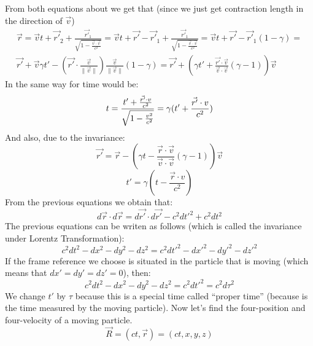 \documentclass{article}
\begin{document}
From both equations about we get that (since we just get contraction length in the direction of $\vec{v}$)
\begin{equation}
  \begin{split}
    \vec{r} = \vec{v}t + \vec{r'}_2 + \frac{\vec{r'}_1}{\sqrt{1-\frac{\vec{v}\cdot \vec{v}}{c^2}}} = \vec{v}t + \vec{r'} - \vec{r'}_1 + \frac{\vec{r'}_1}{\sqrt{1-\frac{\vec{v}\cdot \vec{v}}{c^2}}} =  \vec{v}t + \vec{r'} - \vec{r'}_1(1-\gamma) =\\ \vec{r'} + \vec{v}\gamma t' - (\vec{r'} \cdot \frac{\vec{v}}{\|\vec{v}\|} )\frac{\vec{v}}{\|\vec{v}\|}(1 - \gamma) = \vec{r'} + (\gamma t' + \frac{\vec{r'}\cdot \vec{v}}{\vec{v} \cdot \vec{v}} (\gamma - 1) )\vec{v}
    \end{split}
\end{equation}
In the same way for time would be:
\begin{equation}
  t = \frac{t' + \frac{\vec{r'}\cdot v}{c^2}}{\sqrt{1 - \frac{v^2}{c^2}}} =\gamma(t' + \frac{\vec{r'}\cdot v}{c^2}) \\
\end{equation}
And also, due to the invariance:
\begin{equation}
  \vec{r'} = \vec{r} - (\gamma t - \frac{\vec{r}\cdot \vec{v}}{\vec{v} \cdot \vec{v}} (\gamma - 1) )\vec{v}
\end{equation}
\begin{equation}
  t' = \gamma(t - \frac{\vec{r}\cdot v}{c^2})
\end{equation}
From the previous equations we obtain that:
\begin{equation}
  d\vec{r} \cdot d\vec{r} = d\vec{r'} \cdot d\vec{r'} - c^2dt'^2 + c^2dt^2
\end{equation}
The previous equations can be writen as follows (which is called the invariance under Lorentz Transformation):
\begin{equation}
  c^2dt^2 - dx^2 - dy^2 -dz^2 = c^2dt'^2 - dx'^2 - dy'^2 - dz'^2
\end{equation}
If the frame reference we choose is situated in the particle that is moving (which means that $dx' = dy' = dz' = 0$), then:
\begin{equation}
  c^2dt^2 - dx^2 - dy^2 -dz^2 = c^2dt'^2 = c^2d\tau^2
\end{equation}
We change $t'$ by $\tau$ because this is a special time called ``proper time'' (because is the time measured by the moving particle). Now let's find the four-position and four-velocity of a moving particle.
\begin{equation}
  \vec{R} = (ct,\vec{r}) = (ct,x,y,z)
\end{equation}
\end{document}
